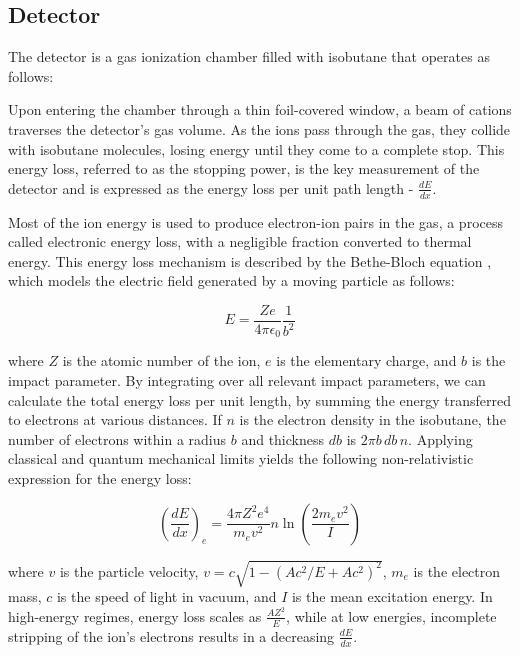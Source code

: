 \subsection{Detector}

The detector is a gas ionization chamber filled with isobutane that operates as follows:

Upon entering the chamber through a thin foil-covered window, a beam of cations traverses the detector’s gas volume. As the ions pass through the gas, they collide with isobutane molecules, losing energy until they come to a complete stop. This energy loss, referred to as the stopping power, is the key measurement of the detector and is expressed as the energy loss per unit path length - \( \frac{dE}{dx} \).

Most of the ion energy is used to produce electron-ion pairs in the gas, a process called electronic energy loss, with a negligible fraction converted to thermal energy. This energy loss mechanism is described by the Bethe-Bloch equation \cite{sigmund2006}, which models the electric field generated by a moving particle as follows:

\begin{equation}
    E = \frac{Ze}{4 \pi \epsilon_0} \frac{1}{b^2}
\end{equation}

where \( Z \) is the atomic number of the ion, \( e \) is the elementary charge, and \( b \) is the impact parameter. By integrating over all relevant impact parameters, we can calculate the total energy loss per unit length, by summing the energy transferred to electrons at various distances. If \( n \) is the electron density in the isobutane, the number of electrons within a radius \( b \) and thickness \( db \) is \( 2\pi b \, db \, n \). Applying classical and quantum mechanical limits yields the following non-relativistic expression for the energy loss:

\begin{equation}
    \left( \frac{dE}{dx} \right)_e = \frac{4 \pi Z^2 e^4}{m_e v^2} n \ln{\left( \frac{2 m_e v^2}{I} \right)}
\end{equation}

where \( v \) is the particle velocity, $v=c\sqrt{1-\left(Ac^{2}/E+Ac^{2}\right)^{2}}$, \( m_e \) is the electron mass, \( c \) is the speed of light in vacuum, and \( I \) is the mean excitation energy. In high-energy regimes, energy loss scales as \( \frac{AZ^2}{E} \), while at low energies, incomplete stripping of the ion’s electrons results in a decreasing \( \frac{dE}{dx} \).

